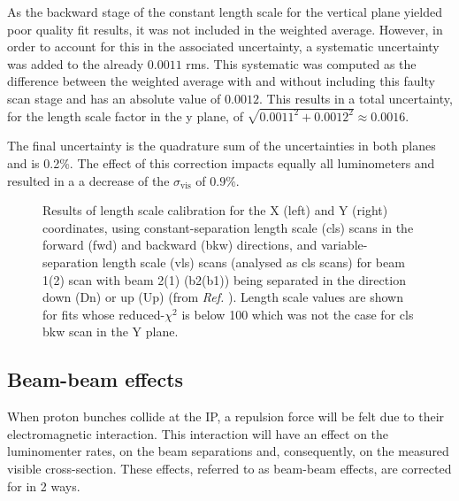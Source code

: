 As the backward stage of the constant length scale for the vertical plane yielded poor quality fit results, it was not included in the weighted average. However, in order to account for this in the associated uncertainty, a systematic uncertainty was added to the already $0.0011$ rms. This systematic was computed as the difference between the weighted average with and without including this faulty scan stage and has an absolute value of $0.0012$. This results in a total uncertainty, for the length scale factor in the y plane, of $\sqrt{0.0011^2 + 0.0012^2} \approx 0.0016$.

The final uncertainty is the quadrature sum of the uncertainties in both planes and is 0.2\%. The effect of this correction impacts equally all luminometers and resulted in a a decrease of the $\sigma_{\mathrm{vis}}$ of $0.9\%$.

\begin{figure}[h!]
	\centering
	\caption{Results of length scale calibration for the X (left) and Y (right) coordinates, using constant-separation length scale (cls) scans in the forward (fwd) and backward (bkw) directions, and variable-separation length scale (vls) scans (analysed as cls scans) for beam 1(2) scan with beam 2(1) (b2(b1)) being separated in the direction down (Dn) or up (Up) (from \textit{Ref.} \cite{CMS-DP-2024-068}). Length scale values are shown for fits whose reduced-$\chi^2$ is below 100 which was not the case for cls bkw scan in the Y plane.}
	\label{fig:length_scale_fit_summary}
\end{figure}

\subsection{Beam-beam effects}

When proton bunches collide at the IP, a repulsion force will be felt due to their electromagnetic interaction. This interaction will have an effect on the luminomenter rates, on the beam separations and, consequently, on the measured visible cross-section. These effects, referred to as beam-beam effects, are corrected for in 2 ways.

